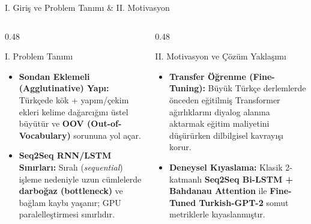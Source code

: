 \documentclass[aspectratio=169,10pt]{beamer}
\begin{document}
\begin{frame}{I. Giriş ve Problem Tanımı \& II. Motivasyon}
    \begin{columns}[T]
        \begin{column}{0.48\textwidth}
            \begin{block}{I. Problem Tanımı}
                \begin{itemize}
                    \item \textbf{Sondan Eklemeli (Agglutinative) Yapı:} Türkçede kök + yapım/çekim ekleri kelime dağarcığını üstel büyütür ve \textbf{OOV (Out-of-Vocabulary)} sorununa yol açar.
                    \item \textbf{Seq2Seq RNN/LSTM Sınırları:} Sıralı (\textit{sequential}) işleme nedeniyle uzun cümlelerde \textbf{darboğaz (bottleneck)} ve bağlam kaybı yaşanır; GPU paralelleştirmesi sınırlıdır.
                \end{itemize}
            \end{block}
        \end{column}
        \begin{column}{0.48\textwidth}
            \begin{block}{II. Motivasyon ve Çözüm Yaklaşımı}
                \begin{itemize}
                    \item \textbf{Transfer Öğrenme (Fine-Tuning):} Büyük Türkçe derlemlerde önceden eğitilmiş Transformer ağırlıklarını diyalog alanına aktarmak eğitim maliyetini düşürürken dilbilgisel kavrayışı korur.
                    \item \textbf{Deneysel Kıyaslama:} Klasik 2-katmanlı \textbf{Seq2Seq Bi-LSTM + Bahdanau Attention} ile \textbf{Fine-Tuned Turkish-GPT-2} somut metriklerle kıyaslanmıştır.
                \end{itemize}
            \end{block}
        \end{column}
    \end{columns}
\end{frame}
\end{document}
